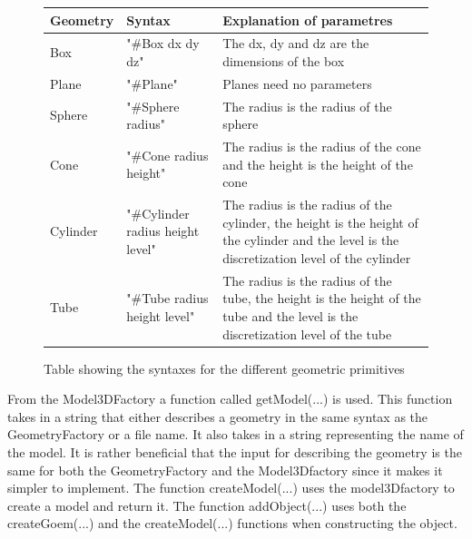\begin{figure}[h]
\centering
\begin{tabular}{|l|l| p{6cm}|}
\hline
Geometry & Syntax                           & Explanation of parametres                                                                                                                    \\ \hline
Box      & "\#Box dx dy dz"                 & The dx, dy and dz are the dimensions of the box                                                                                              \\ \hline
Plane    & "\#Plane"                        & Planes need no parameters                                                                                                                    \\ \hline
Sphere   & "\#Sphere radius"                & The radius is the radius of the sphere                                                                                                       \\ \hline
Cone     & "\#Cone radius height"           & The radius is the radius of the cone and the height is the height of the cone                                                                \\ \hline
Cylinder & "\#Cylinder radius height level" & The radius is the radius of the cylinder, the height is the height of the cylinder and the level is the discretization level of the cylinder \\ \hline
Tube     & "\#Tube radius height level"     & The radius is the radius of the tube, the height is the height of the tube and the level is the discretization level of the tube             \\ \hline
\end{tabular}
\caption{Table showing the syntaxes for the different geometric primitives}
\label{fig:SyntaxTable}
\end{figure}

From the Model3DFactory a function called getModel(...) is used. This function takes in a string that either describes a geometry in the same syntax as the GeometryFactory or a file name. It also takes in a string representing the name of the model. It is rather beneficial that the input for describing the geometry is the same for both the GeometryFactory and the Model3Dfactory since it makes it simpler to implement. The function createModel(...) uses the model3Dfactory to create a model and return it. The function addObject(...) uses both the createGoem(...) and the createModel(...) functions when constructing the object.\\

